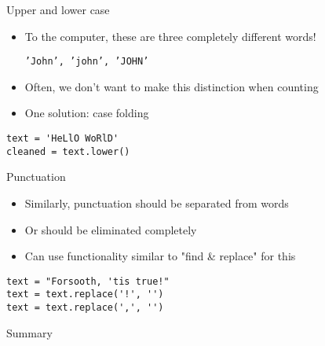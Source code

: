 \documentclass[aspectratio=169,usenames,dvipsnames]{beamer}
\begin{document}
\begin{frame}[fragile]{Upper and lower case}
    \begin{itemize}
        \item To the computer, these
            are three completely different words!

            \texttt{'John', 'john', 'JOHN'}
        \item Often, we don't want to make this distinction when counting
        \item One solution: case folding
    \end{itemize}
    \pause
\begin{lstlisting}
text = 'HeLlO WoRlD'
cleaned = text.lower()
\end{lstlisting}
\end{frame}

\begin{frame}[fragile]{Punctuation}
    \begin{itemize}
        \item Similarly, punctuation should be separated from words
        \item Or should be eliminated completely
        \item Can use functionality similar to "find \& replace" for this
    \end{itemize}
    \pause
\begin{lstlisting}
text = "Forsooth, 'tis true!"
text = text.replace('!', '')
text = text.replace(',', '')
\end{lstlisting}
\end{frame}


\begin{frame}{Summary}
\end{frame}

\end{document}
